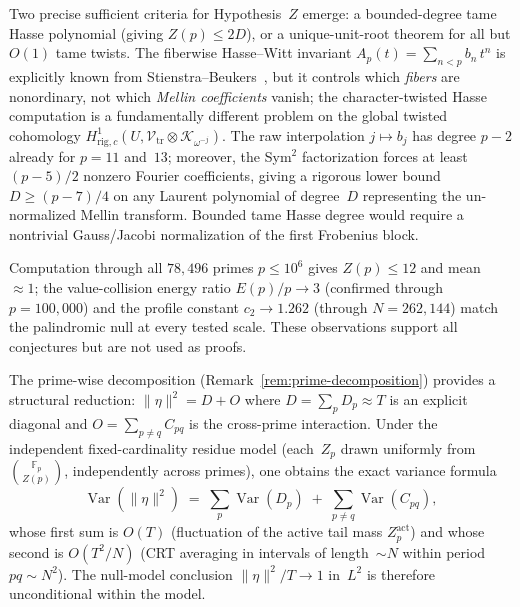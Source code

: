 \documentclass[11pt]{article}
\theoremstyle{definition}
\theoremstyle{remark}
\begin{document}
Two precise sufficient criteria for
Hypothesis~$Z$ emerge:
a bounded-degree tame Hasse polynomial
(giving $Z(p) \le 2D$),
or a unique-unit-root theorem for
all but $O(1)$ tame twists.
The fiberwise Hasse--Witt invariant
$A_p(t) = \sum_{n < p} b_n\,t^n$
is explicitly known from
Stienstra--Beukers~\cite{SB1985},
but it controls which \emph{fibers}
are nonordinary, not which
\emph{Mellin coefficients} vanish;
the character-twisted Hasse computation
is a fundamentally different problem
on the global twisted cohomology
$H^1_{\mathrm{rig},c}(U,
\mathcal{V}_{\mathrm{tr}}
\otimes \mathcal{K}_{\omega^{-j}})$.
The raw interpolation $j \mapsto b_j$
has degree $p - 2$ already for
$p = 11$ and~$13$; moreover, the
Sym$^2$ factorization forces
at least $(p{-}5)/2$ nonzero Fourier
coefficients, giving a rigorous
lower bound $D \ge (p{-}7)/4$
on any Laurent polynomial of
degree~$D$ representing the
un-normalized Mellin transform.
Bounded tame Hasse degree would
require a nontrivial Gauss/Jacobi
normalization of the first
Frobenius block.

Computation through all $78{,}496$ primes
$p \le 10^6$ gives $Z(p) \le 12$ and
mean~$\approx 1$;
the value-collision energy ratio
$E(p)/p \to 3$ (confirmed through $p = 100{,}000$)
and the profile constant
$c_2 \to 1.262$ (through $N = 262{,}144$)
match the palindromic
null at every tested scale.
These observations support all
conjectures but are not used as proofs.

The prime-wise decomposition
(Remark~\ref{rem:prime-decomposition})
provides a structural reduction:
$\|\eta\|^2 = D + O$ where
$D = \sum_p D_p \approx T$ is an
explicit diagonal and
$O = \sum_{p \ne q} C_{pq}$
is the cross-prime interaction.
Under the independent
fixed-cardinality residue model
(each~$Z_p$ drawn uniformly
from $\binom{\mathbb{F}_p}{Z(p)}$,
independently across primes),
one obtains the exact
variance formula
\[
\operatorname{Var}(\|\eta\|^2)
\;=\;
\sum_p \operatorname{Var}(D_p)
\;+\;
\sum_{p \ne q}
\operatorname{Var}(C_{pq}),
\]
whose first sum is $O(T)$
(fluctuation of the active tail mass
$Z_p^{\mathrm{act}}$)
and whose second is
$O(T^2/N)$ (CRT averaging
in intervals of length~$\sim N$
within period~$pq \sim N^2$).
The null-model conclusion
$\|\eta\|^2/T \to 1$ in~$L^2$
is therefore unconditional
within the model.
\end{document}
